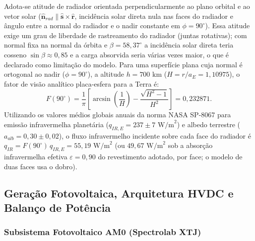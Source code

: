 Adota-se atitude de radiador orientada perpendicularmente ao plano orbital e ao vetor solar ($\hat{\mathbf{n}}_{rad} \parallel \hat{\mathbf{s}} \times \hat{\mathbf{r}}$, incidência solar direta nula nas faces do radiador e ângulo entre a normal do radiador e o nadir constante em $\phi = 90^\circ$). Essa atitude exige um grau de liberdade de rastreamento do radiador (juntas rotativas); com normal fixa na normal da órbita e $\beta = 58{,}37^\circ$ a incidência solar direta teria cosseno $\sin\beta \approx 0{,}85$ e a carga absorvida seria várias vezes maior, o que é declarado como limitação do modelo. Para uma superfície plana cuja normal é ortogonal ao nadir ($\phi = 90^\circ$), a altitude $h = 700\text{ km}$ ($H = r / a_E = 1{,}10975$), o fator de visão analítico placa-esfera para a Terra é:
\begin{equation}
    F(90^\circ) = \frac{1}{\pi}\left[\arcsin\!\left(\frac{1}{H}\right) - \frac{\sqrt{H^2 - 1}}{H^2}\right] = 0{,}232871.
    \label{eq:fator_visao_90}
\end{equation}
Utilizando os valores médios globais anuais da norma NASA SP-8067 \cite{nasa1971sp8067} para emissão infravermelha planetária ($q_{IR,E} = 237 \pm 7\text{ W/m}^2$) e albedo terrestre ($a_{alb} = 0{,}30 \pm 0{,}02$), o fluxo infravermelho incidente sobre cada face do radiador é $q_{IR} = F(90^\circ)\, q_{IR,E} = 55{,}19\text{ W/m}^2$ (ou $49{,}67\text{ W/m}^2$ sob a absorção infravermelha efetiva $\varepsilon = 0{,}90$ do revestimento adotado, por face; o modelo de duas faces usa o dobro).

\subsection{Geração Fotovoltaica, Arquitetura HVDC e Balanço de Potência}
\label{sec:arquitetura_barramento_balanco}

\subsubsection{Subsistema Fotovoltaico AM0 (Spectrolab XTJ)}

